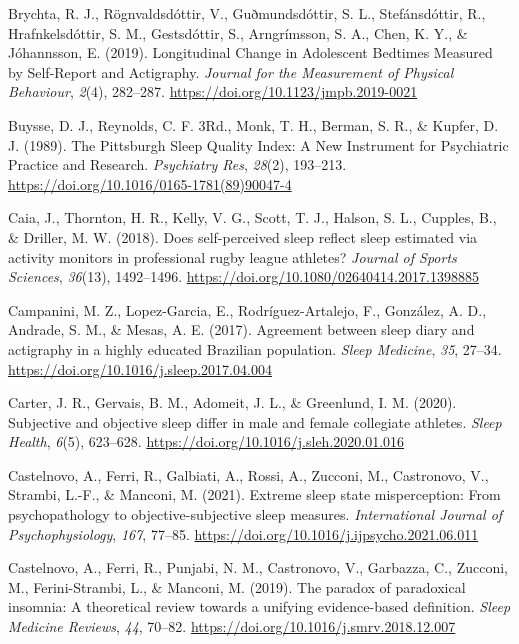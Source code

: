 \documentclass[
]{article}
\newlength{\cslhangindent}
\newenvironment{CSLReferences}[2] %
 {\begin{list}{}{%
  \setlength{\itemindent}{0pt}
  \setlength{\leftmargin}{0pt}
  \setlength{\parsep}{0pt}
  \ifodd #1
   \setlength{\leftmargin}{\cslhangindent}
   \setlength{\itemindent}{-1\cslhangindent}
  \fi
  \setlength{\itemsep}{#2\baselineskip}}}
 {\end{list}}
\begin{document}
\begin{CSLReferences}{1}{0}
Brychta, R. J., Rögnvaldsdóttir, V., Guðmundsdóttir, S. L., Stefánsdóttir, R., Hrafnkelsdóttir, S. M., Gestsdóttir, S., Arngrímsson, S. A., Chen, K. Y., \& Jóhannsson, E. (2019). Longitudinal {Change} in {Adolescent} {Bedtimes} {Measured} by {Self}-{Report} and {Actigraphy}. \emph{Journal for the Measurement of Physical Behaviour}, \emph{2}(4), 282--287. \url{https://doi.org/10.1123/jmpb.2019-0021}

Buysse, D. J., Reynolds, C. F. 3Rd., Monk, T. H., Berman, S. R., \& Kupfer, D. J. (1989). {The Pittsburgh Sleep Quality Index: A New Instrument for Psychiatric Practice and Research}. \emph{Psychiatry Res}, \emph{28}(2), 193--213. \url{https://doi.org/10.1016/0165-1781(89)90047-4}

Caia, J., Thornton, H. R., Kelly, V. G., Scott, T. J., Halson, S. L., Cupples, B., \& Driller, M. W. (2018). Does self-perceived sleep reflect sleep estimated via activity monitors in professional rugby league athletes? \emph{Journal of Sports Sciences}, \emph{36}(13), 1492--1496. \url{https://doi.org/10.1080/02640414.2017.1398885}

Campanini, M. Z., Lopez-Garcia, E., Rodríguez-Artalejo, F., González, A. D., Andrade, S. M., \& Mesas, A. E. (2017). Agreement between sleep diary and actigraphy in a highly educated {Brazilian} population. \emph{Sleep Medicine}, \emph{35}, 27--34. \url{https://doi.org/10.1016/j.sleep.2017.04.004}

Carter, J. R., Gervais, B. M., Adomeit, J. L., \& Greenlund, I. M. (2020). Subjective and objective sleep differ in male and female collegiate athletes. \emph{Sleep Health}, \emph{6}(5), 623--628. \url{https://doi.org/10.1016/j.sleh.2020.01.016}

Castelnovo, A., Ferri, R., Galbiati, A., Rossi, A., Zucconi, M., Castronovo, V., Strambi, L.-F., \& Manconi, M. (2021). Extreme sleep state misperception: {From} psychopathology to objective-subjective sleep measures. \emph{International Journal of Psychophysiology}, \emph{167}, 77--85. \url{https://doi.org/10.1016/j.ijpsycho.2021.06.011}

Castelnovo, A., Ferri, R., Punjabi, N. M., Castronovo, V., Garbazza, C., Zucconi, M., Ferini-Strambi, L., \& Manconi, M. (2019). {The paradox of paradoxical insomnia: A theoretical review towards a unifying evidence-based definition}. \emph{Sleep Medicine Reviews}, \emph{44}, 70--82. \url{https://doi.org/10.1016/j.smrv.2018.12.007}


\end{CSLReferences}
\end{document}
